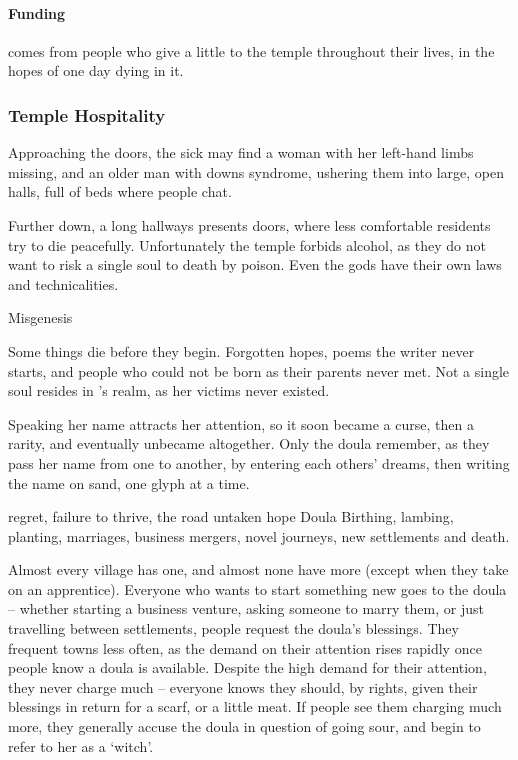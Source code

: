 \begin{multicols}{2}
\paragraph{Funding}
comes from people who give a little to the temple throughout their lives, in the hopes of one day dying in it.

\subsubsection{Temple Hospitality}
Approaching the doors, the sick may find a woman with her left-hand limbs missing, and an older man with downs syndrome, ushering them into large, open halls, full of beds where people chat.

Further down, a long hallways presents doors, where less comfortable residents try to die peacefully.
Unfortunately the temple forbids alcohol, as they do not want to risk a single soul to death by poison.
Even the gods have their own laws and technicalities.

\guild[\decosix]{\hphantom{Nemo}}%
  {Misgenesis}%
  {
  Some things die before they begin.
  Forgotten hopes, poems the writer never starts, and people who could not be born as their parents never met.
  Not a single soul resides in \hphantom{Nemo}'s realm, as her victims never existed.

  Speaking her name attracts her attention, so it soon became a curse, then a rarity, and eventually unbecame altogether.
  Only the doula remember, as they pass her name from one to another, by entering each others' dreams, then writing the name on sand, one glyph at a time.
  }%
  {regret, failure to thrive, the road untaken}%
  {hope}%
  {Doula}%
  {
    Birthing, lambing, planting, marriages, business mergers, novel journeys, new settlements and death.
  }%

  Almost every village has one, and almost none have more (except when they take on an apprentice).
  Everyone who wants to start something new goes to the doula -- whether starting a business venture, asking someone to marry them, or just travelling between settlements, people request the doula's blessings.
  They frequent towns less often, as the demand on their attention rises rapidly once people know a doula is available.
  Despite the high demand for their attention, they never charge much -- everyone knows they should, by rights, given their blessings in return for a scarf, or a little meat.
  If people see them charging much more, they generally accuse the doula in question of going sour, and begin to refer to her as a `witch'.


\end{multicols}
